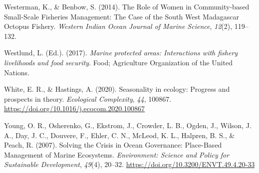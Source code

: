 \documentclass[
]{article}
\newlength{\cslhangindent}
\newlength{\cslentryspacingunit} %
\newenvironment{CSLReferences}[2] %
 {%
  \setlength{\parindent}{0pt}
  \ifodd #1
  \let\oldpar\par
  \def\par{\hangindent=\cslhangindent\oldpar}
  \fi
  \setlength{\parskip}{#2\cslentryspacingunit}
 }%
 {}
\begin{document}
\begin{CSLReferences}{1}{2}
\leavevmode{}%
Westerman, K., \& Benbow, S. (2014). The {Role} of {Women} in {Community}-based {Small}-{Scale} {Fisheries} {Management}: {The} {Case} of the {South} {West} {Madagascar} {Octopus} {Fishery}. \emph{Western Indian Ocean Journal of Marine Science}, \emph{12}(2), 119--132.

\leavevmode{}%
Westlund, L. (Ed.). (2017). \emph{Marine protected areas: Interactions with fishery livelihoods and food security}. Food; Agriculture Organization of the United Nations.

\leavevmode{}%
White, E. R., \& Hastings, A. (2020). Seasonality in ecology: {Progress} and prospects in theory. \emph{Ecological Complexity}, \emph{44}, 100867. \url{https://doi.org/10.1016/j.ecocom.2020.100867}

\leavevmode{}%
Young, O. R., Osherenko, G., Ekstrom, J., Crowder, L. B., Ogden, J., Wilson, J. A., Day, J. C., Douvere, F., Ehler, C. N., McLeod, K. L., Halpren, B. S., \& Peach, R. (2007). Solving the {Crisis} in {Ocean} {Governance}: {Place}-{Based} {Management} of {Marine} {Ecosystems}. \emph{Environment: Science and Policy for Sustainable Development}, \emph{49}(4), 20--32. \url{https://doi.org/10.3200/ENVT.49.4.20-33}

\end{CSLReferences}
\end{document}
